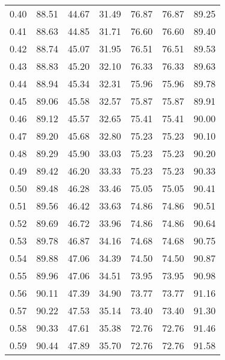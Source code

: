 \begin{tabular}{|c|c|c|c|c|c|c|}
      0.40 &     88.51 &     44.67 &      31.49 &   76.87 &      76.87 &         89.25 \\
      0.41 &     88.63 &     44.85 &      31.71 &   76.60 &      76.60 &         89.40 \\
      0.42 &     88.74 &     45.07 &      31.95 &   76.51 &      76.51 &         89.53 \\
      0.43 &     88.83 &     45.20 &      32.10 &   76.33 &      76.33 &         89.63 \\
      0.44 &     88.94 &     45.34 &      32.31 &   75.96 &      75.96 &         89.78 \\
      0.45 &     89.06 &     45.58 &      32.57 &   75.87 &      75.87 &         89.91 \\
      0.46 &     89.12 &     45.57 &      32.65 &   75.41 &      75.41 &         90.00 \\
      0.47 &     89.20 &     45.68 &      32.80 &   75.23 &      75.23 &         90.10 \\
      0.48 &     89.29 &     45.90 &      33.03 &   75.23 &      75.23 &         90.20 \\
      0.49 &     89.42 &     46.20 &      33.33 &   75.23 &      75.23 &         90.33 \\
      0.50 &     89.48 &     46.28 &      33.46 &   75.05 &      75.05 &         90.41 \\
      0.51 &     89.56 &     46.42 &      33.63 &   74.86 &      74.86 &         90.51 \\
      0.52 &     89.69 &     46.72 &      33.96 &   74.86 &      74.86 &         90.64 \\
      0.53 &     89.78 &     46.87 &      34.16 &   74.68 &      74.68 &         90.75 \\
      0.54 &     89.88 &     47.06 &      34.39 &   74.50 &      74.50 &         90.87 \\
      0.55 &     89.96 &     47.06 &      34.51 &   73.95 &      73.95 &         90.98 \\
      0.56 &     90.11 &     47.39 &      34.90 &   73.77 &      73.77 &         91.16 \\
      0.57 &     90.22 &     47.53 &      35.14 &   73.40 &      73.40 &         91.30 \\
      0.58 &     90.33 &     47.61 &      35.38 &   72.76 &      72.76 &         91.46 \\
      0.59 &     90.44 &     47.89 &      35.70 &   72.76 &      72.76 &         91.58 \\

\end{tabular}
